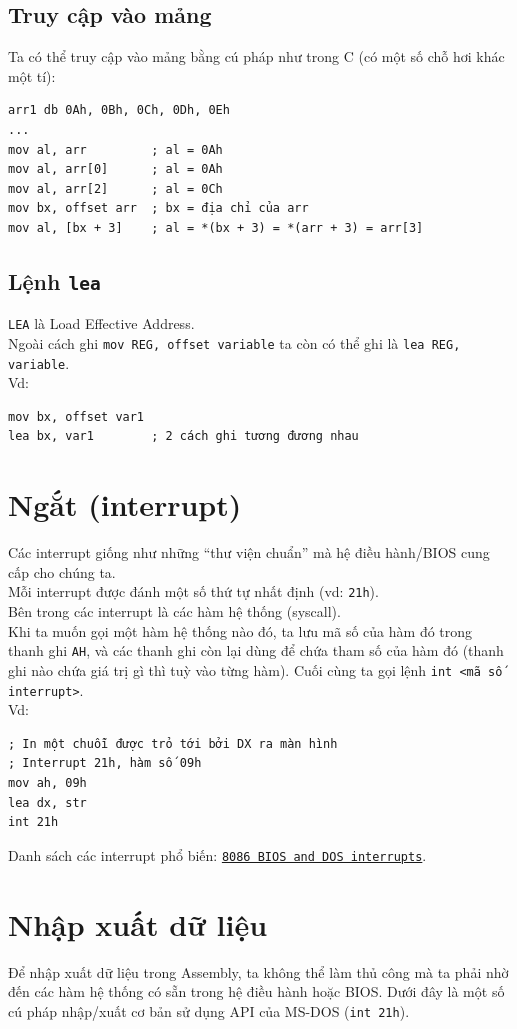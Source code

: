 \documentclass[12pt]{report}
\newcommand{\code}[1]{\texttt{#1}}
\begin{document}
\subsection{Truy cập vào mảng}
Ta có thể truy cập vào mảng bằng cú pháp như trong C (có một số chỗ hơi khác một tí):
\begin{verbatim}
arr1 db 0Ah, 0Bh, 0Ch, 0Dh, 0Eh 
... 
mov al, arr         ; al = 0Ah 
mov al, arr[0]      ; al = 0Ah 
mov al, arr[2]      ; al = 0Ch 
mov bx, offset arr  ; bx = địa chỉ của arr
mov al, [bx + 3]    ; al = *(bx + 3) = *(arr + 3) = arr[3]
\end{verbatim}

\subsection{Lệnh \code{lea}}
\code{LEA} là Load Effective Address.\\
Ngoài cách ghi \code{mov REG, offset variable} ta còn có thể ghi là \code{lea REG, variable}.\\
Vd:
\begin{verbatim}
mov bx, offset var1 
lea bx, var1        ; 2 cách ghi tương đương nhau
\end{verbatim}

\section{Ngắt (interrupt)}
Các interrupt giống như những ``thư viện chuẩn'' mà hệ điều hành/BIOS cung cấp cho chúng ta. \\
Mỗi interrupt được đánh một số thứ tự nhất định (vd: \code{21h}).\\
Bên trong các interrupt là các hàm hệ thống (syscall).\\
Khi ta muốn gọi một hàm hệ thống nào đó, ta lưu mã số của hàm đó trong thanh ghi \code{AH}, và các thanh ghi còn lại dùng để chứa tham số của hàm đó (thanh ghi nào chứa giá trị gì thì tuỳ vào từng hàm). Cuối cùng ta gọi lệnh \code{int <mã số interrupt>}.\\
Vd:
\begin{verbatim}
; In một chuỗi được trỏ tới bởi DX ra màn hình 
; Interrupt 21h, hàm số 09h
mov ah, 09h 
lea dx, str 
int 21h
\end{verbatim} 
Danh sách các interrupt phổ biến: \href{https://jbwyatt.com/253/emu/8086_bios_and_dos_interrupts.html}{\code{8086 BIOS and DOS interrupts}}.

\section{Nhập xuất dữ liệu}
Để nhập xuất dữ liệu trong Assembly, ta không thể làm thủ công mà ta phải nhờ đến các hàm hệ thống có sẵn trong hệ điều hành hoặc BIOS. Dưới đây là một số cú pháp nhập/xuất cơ bản sử dụng API của MS-DOS (\code{int 21h}).
\end{document}
